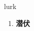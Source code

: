 
\begin{frame}
{\huge lurk}
\begin{center}
\begin{enumerate}\Large
  \item \textbf{潜伏}
\end{enumerate}
\end{center}
\end{frame}
